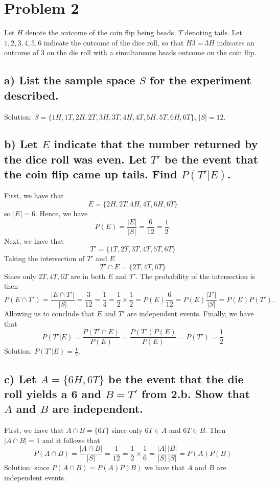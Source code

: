 \documentclass[11pt, letterpaper]{article}
\begin{document}
\section*{Problem 2}
Let $H$ denote the outcome of the coin flip being heads, $T$ denoting tails. Let $1,2,3,4,5,6$ 
indicate the outcome of the dice roll, so that $H3=3H$ indicates an outcome of 3 on the die roll
with a simultaneous heads outcome on the coin flip. 

\subsection*{a) \normalfont List the sample space $S$ for the experiment described.}
Solution: $S=\{1H,1T,2H,2T,3H,3T,4H,4T,5H,5T,6H,6T\}$, $|S|=12$.

\subsection*{b) \normalfont Let $E$ indicate that the number returned by the dice roll was even. Let $T\prime$
be the event that the coin flip came up tails. Find $P(T\prime|E)$.}
First, we have that
\[E=\{2H, 2T, 4H,4T,6H,6T\}\]
so $|E|=6$. Hence, we have
\[P(E)=\frac{|E|}{|S|}=\frac{6}{12}=\frac{1}{2}.\]
Next, we have that
\[T\prime=\{1T,2T,3T,4T,5T,6T\}\]
Taking the intersection of $T\prime$ and $E$
\[T\prime\cap E=\{2T,4T,6T\}\]
Since only $2T,4T,6T$ are in both $E$ and $T\prime$. The probability of the intersection is then
\[P(E\cap T\prime)=\frac{|E\cap T\prime|}{|S|}=\frac{3}{12}=\frac{1}{4}=\frac{1}{2}\times\frac{1}{2}=P(E)\frac{6}{12}=P(E)\frac{|T\prime|}{|S|}=P(E)P(T\prime).\]
Allowing us to conclude that $E$ and $T\prime$ are independent events. Finally, we have that
\[P(T\prime|E)=\frac{P(T\prime\cap E)}{P(E)}=\frac{P(T\prime)P(E)}{P(E)}=P(T\prime)=\frac{1}{2}\]
Solution: $P(T\prime|E)=\frac{1}{2}$.

\subsection*{c) \normalfont Let $A=\{6H,6T\}$ be the event that the die roll yields a 6 and $B=T\prime$ 
from 2.b. Show that $A$ and $B$ are independent.}
First, we have that $A\cap B=\{6T\}$ since only $6T\in A$ and $6T\in B$. Then $|A\cap B|=1$ and it follows that
\[P(A\cap B)=\frac{|A\cap B|}{|S|}=\frac{1}{12}=\frac{1}{2}\times \frac{1}{6}=\frac{|A|}{|S|}\frac{|B|}{|S|}=P(A)P(B)\]
Solution: since $P(A\cap B)=P(A)P(B)$ we have that $A$ and $B$ are independent events.
\end{document}
